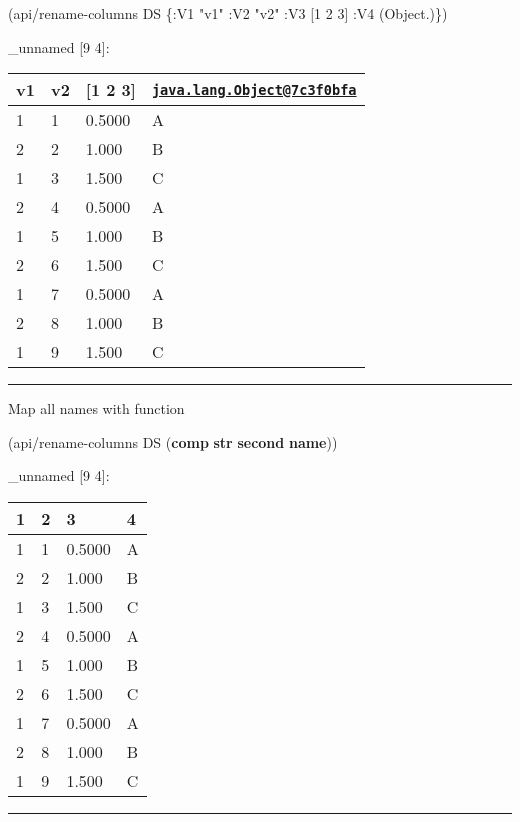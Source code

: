 \documentclass[]{article}
\newenvironment{Shaded}{\begin{snugshade}}{\end{snugshade}}
\newcommand{\KeywordTok}[1]{\textcolor[rgb]{0.13,0.29,0.53}{\textbf{#1}}}
\newcommand{\DecValTok}[1]{\textcolor[rgb]{0.00,0.00,0.81}{#1}}
\newcommand{\StringTok}[1]{\textcolor[rgb]{0.31,0.60,0.02}{#1}}
\newcommand{\AttributeTok}[1]{\textcolor[rgb]{0.77,0.63,0.00}{#1}}
\newcommand{\NormalTok}[1]{#1}
\begin{document}
\begin{Shaded}
\begin{Highlighting}[]
\NormalTok{(api/rename-columns DS \{}\AttributeTok{:V1} \StringTok{"v1"}
                        \AttributeTok{:V2} \StringTok{"v2"}
                        \AttributeTok{:V3}\NormalTok{ [}\DecValTok{1} \DecValTok{2} \DecValTok{3}\NormalTok{]}
                        \AttributeTok{:V4}\NormalTok{ (Object.)\})}
\end{Highlighting}
\end{Shaded}

\_unnamed {[}9 4{]}:

\begin{longtable}[]{@{}llll@{}}
\toprule
v1 & v2 & {[}1 2 3{]} &
\href{mailto:java.lang.Object@7c3f0bfa}{\nolinkurl{java.lang.Object@7c3f0bfa}}\tabularnewline
\midrule
\endhead
1 & 1 & 0.5000 & A\tabularnewline
2 & 2 & 1.000 & B\tabularnewline
1 & 3 & 1.500 & C\tabularnewline
2 & 4 & 0.5000 & A\tabularnewline
1 & 5 & 1.000 & B\tabularnewline
2 & 6 & 1.500 & C\tabularnewline
1 & 7 & 0.5000 & A\tabularnewline
2 & 8 & 1.000 & B\tabularnewline
1 & 9 & 1.500 & C\tabularnewline
\bottomrule
\end{longtable}

\begin{center}\rule{0.5\linewidth}{0.5pt}\end{center}

Map all names with function

\begin{Shaded}
\begin{Highlighting}[]
\NormalTok{(api/rename-columns DS (}\KeywordTok{comp} \KeywordTok{str} \KeywordTok{second} \KeywordTok{name}\NormalTok{))}
\end{Highlighting}
\end{Shaded}

\_unnamed {[}9 4{]}:

\begin{longtable}[]{@{}llll@{}}
\toprule
1 & 2 & 3 & 4\tabularnewline
\midrule
\endhead
1 & 1 & 0.5000 & A\tabularnewline
2 & 2 & 1.000 & B\tabularnewline
1 & 3 & 1.500 & C\tabularnewline
2 & 4 & 0.5000 & A\tabularnewline
1 & 5 & 1.000 & B\tabularnewline
2 & 6 & 1.500 & C\tabularnewline
1 & 7 & 0.5000 & A\tabularnewline
2 & 8 & 1.000 & B\tabularnewline
1 & 9 & 1.500 & C\tabularnewline
\bottomrule
\end{longtable}

\begin{center}\rule{0.5\linewidth}{0.5pt}\end{center}
\end{document}
